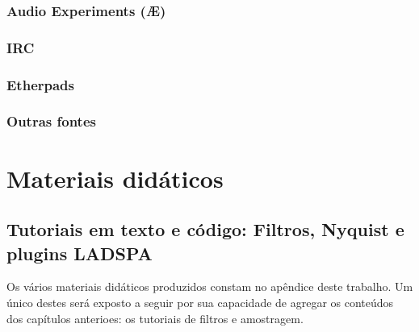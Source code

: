 \subsubsection{Audio Experiments (Æ)}

\subsubsection{IRC}

\subsubsection{Etherpads}

\subsubsection{Outras fontes}


\section{Materiais didáticos}

  \subsection{Tutoriais em texto e código: Filtros, Nyquist e plugins LADSPA}

Os vários materiais didáticos produzidos constam no apêndice
deste trabalho. Um único destes será exposto a seguir por sua
capacidade de agregar os conteúdos dos capítulos anterioes:
os tutoriais de filtros e amostragem.

